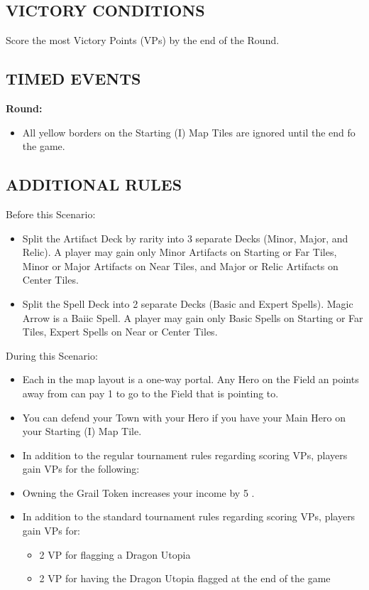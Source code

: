 \begin{multicols}{2}
\subsection*{\MakeUppercase{Victory Conditions}}
Score the most Victory Points (VPs) by the end of the  Round.

\subsection*{\MakeUppercase{Timed Events}}

\textbf{ Round:}
\begin{itemize}
  \item All yellow borders on the Starting (I) Map Tiles are ignored until the end fo the game.
\end{itemize}

\subsection*{\MakeUppercase{Additional Rules}}
Before this Scenario:

\begin{itemize}
  \item Split the Artifact Deck by rarity into 3 separate Decks (Minor, Major, and Relic).
    A player may gain only Minor Artifacts on Starting or Far Tiles, Minor or Major Artifacts on Near Tiles, and Major or Relic Artifacts on Center Tiles.
  \item Split the Spell Deck into 2 separate Decks (Basic and Expert Spells). Magic Arrow is a Baiic Spell.
    A player may gain only Basic Spells on Starting or Far Tiles, Expert Spells on Near or Center Tiles.
\end{itemize}

During this Scenario:

\begin{itemize}
  \item Each  in the map layout is a one-way portal.
    Any Hero on the Field an  points away from can pay 1  to go to the Field that  is pointing to.
  \item You can defend your Town with your Hero if you have your Main Hero on your Starting (I) Map Tile.
  \item In addition to the regular tournament rules regarding scoring VPs, players gain VPs for the following:
  \item Owning the Grail Token increases your income by 5 .
  \item In addition to the standard tournament rules regarding scoring VPs, players gain VPs for:
  \begin{itemize}
    \item 2 VP for flagging a Dragon Utopia
    \item 2 VP for having the Dragon Utopia flagged at the end of the game
  \end{itemize}
\end{itemize}


\end{multicols}
